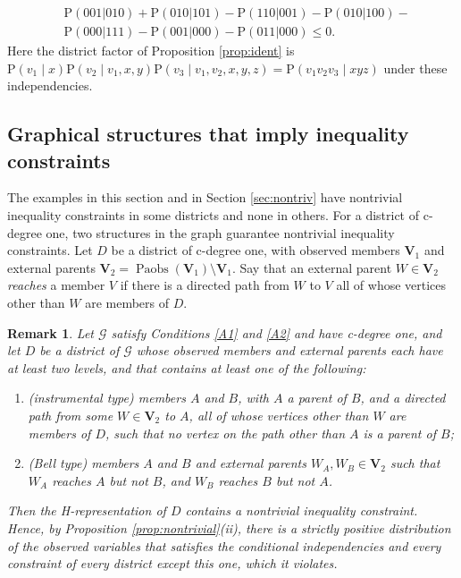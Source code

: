 \documentclass[12pt]{article}
\newtheorem{remark}{Remark}
\def\Pr{{\mathrm{P}}}
\DeclareMathOperator{\Paobs}{Paobs}
\newcommand{\bV}{\boldsymbol{V}}
\begin{document}
\begin{align*}
& \Pr(001|010) + \Pr(010|101) - \Pr(110|001) - \Pr(010|100) - \\
& \Pr(000|111) - \Pr(001|000) - \Pr(011|000) \leq 0.
\end{align*}
Here the district factor of Proposition \ref{prop:ident} is $\Pr(v_1 \mid x)\Pr(v_2 \mid v_1, x, y)\Pr(v_3 \mid v_1, v_2, x, y, z) = \Pr(v_1 v_2 v_3 \mid xyz)$ under these independencies.


\subsection{Graphical structures that imply inequality constraints} \label{sec:structures}

The examples in this section and in Section \ref{sec:nontriv} have nontrivial inequality constraints in some districts and none in others. For a district of c-degree one, two structures in the graph guarantee nontrivial inequality constraints. Let $D$ be a district of c-degree one, with observed members $\bV_1$ and external parents $\bV_2 = \Paobs(\bV_1) \setminus \bV_1$. Say that an external parent $W \in \bV_2$ \emph{reaches} a member $V$ if there is a directed path from $W$ to $V$ all of whose vertices other than $W$ are members of $D$.

\begin{remark} \label{prop:ineqstructure}
Let $\mathcal{G}$ satisfy Conditions \ref{A1} and \ref{A2} and have c-degree one, and let $D$ be a district of $\mathcal{G}$ whose observed members and external parents each have at least two levels, and that contains at least one of the following:
\begin{enumerate}
\item[(i)] (\emph{instrumental type}) members $A$ and $B$, with $A$ a parent of $B$, and a directed path from some $W \in \bV_2$ to $A$, all of whose vertices other than $W$ are members of $D$, such that no vertex on the path other than $A$ is a parent of $B$;
\item[(ii)] (\emph{Bell type}) members $A$ and $B$ and external parents $W_A, W_B \in \bV_2$ such that $W_A$ reaches $A$ but not $B$, and $W_B$ reaches $B$ but not $A$.
\end{enumerate}
Then the H-representation of $D$ contains a nontrivial inequality constraint. Hence, by Proposition \ref{prop:nontrivial}(ii), there is a strictly positive distribution of the observed variables that satisfies the conditional independencies and every constraint of every district except this one, which it violates.
\end{remark}
\end{document}
